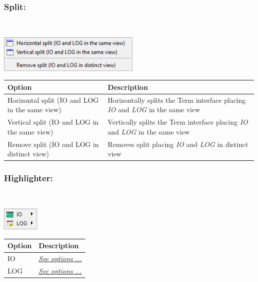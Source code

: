 \hypertarget{menu_view_r_term_split}{}
\subsubsection{Split:}\\

\includegraphics[scale=0.50]{./res/menu_r_term_split.png}\\

\begin{scriptsize}
  \begin{tabularx}{\textwidth}{>{\hsize=1\hsize}X>{\hsize=0.7\hsize}X}\\
    \hline
    \textbf{Option} & \textbf{Description} \\
    \hline
    Horizontal split (IO and LOG in the same view) & Horizontally splits the Term interface placing
     \textit{IO} and \textit{LOG} in the same view \\
    Vertical split (IO and LOG in the same view) & Vertically splits the Term interface placing
     \textit{IO} and \textit{LOG} in the same view \\
    \hdashline[1pt/1pt]
    Remove split (IO and LOG in distinct view) & Removes split placing
     \textit{IO} and \textit{LOG} in distinct view \\
    \hline
  \end{tabularx}
\end{scriptsize}


\newpage
\hypertarget{menu_view_r_term_highlighter}{}
\subsubsection{Highlighter:}\\

\includegraphics[scale=0.50]{./res/menu_r_term_highlighter.png}\\

\begin{scriptsize}
  \begin{tabularx}{\textwidth}{>{\hsize=0.3\hsize}X>{\hsize=0.7\hsize}X}\\
    \hline
    \textbf{Option} & \textbf{Description} \\
    \hline
    IO & \textit{\href{\#menu\_r\_term\_highlighter\_IO}{See options ...}} \\
    LOG & \textit{\href{\#menu\_r\_term\_highlighter\_Log}{See options ...}} \\
    \hline
  \end{tabularx}
\end{scriptsize}


